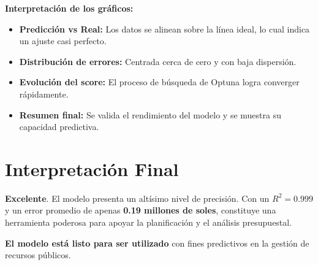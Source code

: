 \documentclass[12pt]{article}
\begin{document}
	\vspace{1em}
	\noindent\textbf{Interpretación de los gráficos:}
	\begin{itemize}
		\item \textbf{Predicción vs Real:} Los datos se alinean sobre la línea ideal, lo cual indica un ajuste casi perfecto.
		\item \textbf{Distribución de errores:} Centrada cerca de cero y con baja dispersión.
		\item \textbf{Evolución del score:} El proceso de búsqueda de Optuna logra converger rápidamente.
		\item \textbf{Resumen final:} Se valida el rendimiento del modelo y se muestra su capacidad predictiva.
	\end{itemize}
	
	\section*{Interpretación Final}
	
	\textcolor{green!50!black}{\textbf{Excelente}}. El modelo presenta un altísimo nivel de precisión. Con un \( R^2 = 0.999 \) y un error promedio de apenas \textbf{0.19 millones de soles}, constituye una herramienta poderosa para apoyar la planificación y el análisis presupuestal.
	
	\vspace{1em}
	\textcolor{blue!70!black}{\textbf{El modelo está listo para ser utilizado}} con fines predictivos en la gestión de recursos públicos.
	
\end{document}
